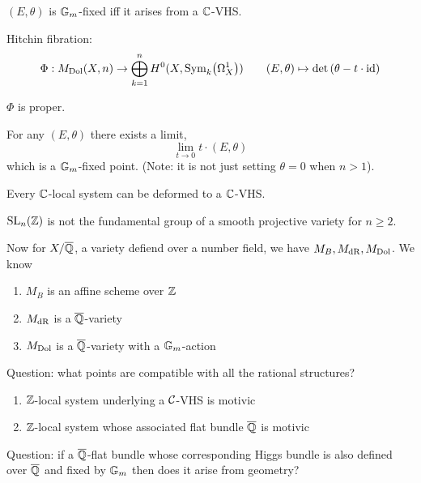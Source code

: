 \documentclass[12pt]{article}
\begin{document}
\begin{prop}[Simpson]
$(E, \theta)$ is $\mathbb{G}_m$-fixed iff it arises from a $\mathbb{C}$-VHS. 
\end{prop}

Hitchin fibration: 
\[ \Phi : M_{\mathrm{Dol}}(X, n) \to \bigoplus_{k = 1}^n H^0(X, \mathrm{Sym}_{k}\! \left( \Omega^1_X \right)) \quad \quad (E, \theta) \mapsto \det{(\theta - t \cdot \mathrm{id})} \]

\begin{theorem}
$\Phi$ is proper. 
\end{theorem} 

\begin{cor}
For any $(E, \theta)$ there exists a limit,
\[ \lim_{t \to 0 } t \cdot (E, \theta) \]
which is a $\mathbb{G}_m$-fixed point. (Note: it is not just setting $\theta = 0$ when $n > 1$). 
\end{cor}

\begin{cor}
Every $\mathbb{C}$-local system can be deformed to a $\mathbb{C}$-VHS. 
\end{cor}

\begin{cor}
$\mathrm{SL}_n(\mathbb{Z})$ is not the fundamental group of a smooth projective variety for $n \ge 2$. 
\end{cor}

Now for $X / \overline{\mathbb{Q}}$, a variety defiend over a number field, we have $M_B, M_{\mathrm{dR}}, M_{\mathrm{Dol}}$. We know
\begin{enumerate}
\item $M_B$ is an affine scheme over $\mathbb{Z}$
\item $M_{\mathrm{dR}}$ is a $\overline{\mathbb{Q}}$-variety
\item $M_{\mathrm{Dol}}$ is a $\overline{\mathbb{Q}}$-variety with a $\mathbb{G}_m$-action
\end{enumerate}

Question: what points are compatible with all the rational structures? 

\begin{conj}[Simpson]
\begin{enumerate}
\item $\mathbb{Z}$-local system underlying a $\mathcal{C}$-VHS is motivic
\item $\mathbb{Z}$-local system whose associated flat bundle $\overline{\mathbb{Q}}$ is motivic
\end{enumerate}
\end{conj}

Question: if a $\overline{\mathbb{Q}}$-flat bundle whose corresponding Higgs bundle is also defined over $\overline{\mathbb{Q}}$ and fixed by $\mathbb{G}_m$ then does it arise from geometry? 
\end{document}
